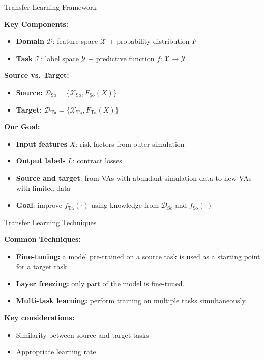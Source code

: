 \documentclass[9pt,handout]{beamer}
\begin{document}
\begin{frame}{Transfer Learning Framework}

    \textbf{Key Components:}
    \begin{itemize}
        \item   \textbf{Domain} $\mathcal{D}$: feature space $\mathcal{X}$ + probability distribution $F$
        \item   \textbf{Task} $\mathcal{T}$: label space $\mathcal{Y}$ + predictive function $f: \mathcal{X} \rightarrow \mathcal{Y}$
    \end{itemize}

    \vspace{10pt}
    \textbf{Source vs. Target:}
    \begin{itemize}
        \item   \textbf{Source:} $\mathcal{D}_{\text{So}} = \{\mathcal{X}_{\text{So}}, F_{\text{So}}(X)\}$
        \item   \textbf{Target:} $\mathcal{D}_{\text{Ta}} = \{\mathcal{X}_{\text{Ta}}, F_{\text{Ta}}(X)\}$
    \end{itemize}

    \vspace{10pt}
    \textbf{Our Goal:}
    \begin{itemize}
        \item   \textbf{Input features} $X$: risk factors from outer simulation
        \item   \textbf{Output labels} $L$: contract losses
        \item   \textbf{Source and target}: from VAs with abundant simulation data to new VAs with limited data
        \item   \textbf{Goal}: improve $f_{\text{Ta}}(\cdot)$ using knowledge from $\mathcal{D}_{\text{So}}$ and $f_{\text{So}}(\cdot)$
    \end{itemize}

\end{frame}

\begin{frame}{Transfer Learning Techniques}

    \textbf{Common Techniques:}
    \begin{itemize}
        \item   \textbf{Fine-tuning:} a model pre-trained on a source task is used as a starting point for a target task.
        \item   \textbf{Layer freezing:} only part of the model is fine-tuned.
        \item   \textbf{Multi-task learning:} perform training on multiple tasks simultaneously.
    \end{itemize}

    \vspace{10pt}

    \textbf{Key considerations:}
    \begin{itemize}
        \item   Similarity between source and target tasks
        \item   Appropriate learning rate
    \end{itemize}

\end{frame}
\end{document}
